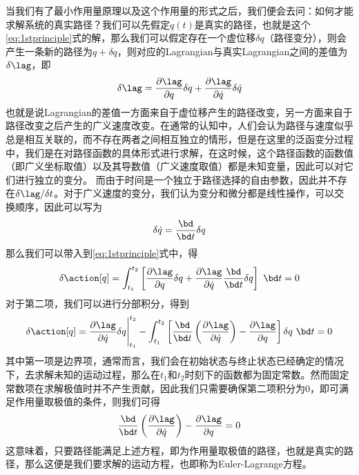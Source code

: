 当我们有了最小作用量原理以及这个作用量的形式之后，我们便会去问：如何才能求解系统的真实路径？我们可以先假定$q(t)$是真实的路径，也就是这个\eqref{eq:1stprinciple}式的解，那么我们可以假定存在一个虚位移$\delta q$（路径变分），则会产生一条新的路径为$q+\delta q$，则对应的Lagrangian与真实Lagrangian之间的差值为$\delta\lag$，即
\begin{equation}
    \delta\lag = \frac{\partial\lag}{\partial q}\delta q + \frac{\partial\lag}{\partial \dot q}\delta \dot q 
\end{equation}
也就是说Lagrangian的差值一方面来自于虚位移产生的路径改变，另一方面来自于路径改变之后产生的广义速度改变。在通常的认知中，人们会认为路径与速度似乎总是相互关联的，而不存在两者之间相互独立的情形，但是在这里的泛函变分过程中，我们是在对路径函数的具体形式进行求解，在这时候，这个路径函数的函数值（即广义坐标取值）以及其导数值（广义速度取值）都是未知变量，因此可以对它们进行独立的变分。
而由于时间是一个独立于路径选择的自由参数，因此并不存在$\delta\lag/\delta t$。对于广义速度的变分，我们认为变分和微分都是线性操作，可以交换顺序，因此可以写为
\begin{equation}
    \delta\dot q = \frac{\bd }{\bd t}\delta q
\end{equation}
那么我们可以带入到\eqref{eq:1stprinciple}式中，得
\begin{equation}
    \delta\action[q] = \int_{t_1}^{t_2}\left[ \frac{\partial\lag}{\partial q}\delta q + \frac{\partial\lag}{\partial \dot q}\frac{\bd }{\bd t}\delta q  \right] ~\bd t=0
\end{equation}
对于第二项，我们可以进行分部积分，得到
\begin{equation}
    \delta\action[q] = \frac{\partial\lag}{\partial \dot q}\delta q\Bigg|_{t_1}^{t_2}- \int_{t_1}^{t_2}\left[ \frac{\bd }{\bd t} \left(\frac{\partial\lag}{\partial \dot{q}} \right) -\frac{\partial\lag}{\partial q}  \right] \delta q~\bd t=0
\end{equation}
其中第一项是边界项，通常而言，我们会在初始状态与终止状态已经确定的情况下，去求解未知的运动过程，那么在$t_1$和$t_2$时刻下的函数都为固定常数。然而固定常数项在求解极值时并不产生贡献，因此我们只需要确保第二项积分为0，即可满足作用量取极值的条件，则我们可得
\begin{equation}
    \frac{\bd}{\bd t} \left(\frac{\partial\lag}{\partial \dot{q}} \right)-\frac{\partial\lag}{\partial q}  = 0
\end{equation}
这意味着，只要路径能满足上述方程，即为作用量取极值的路径，也就是真实的路径，那么这便是我们要求解的运动方程，也即称为Euler-Lagrange方程。

